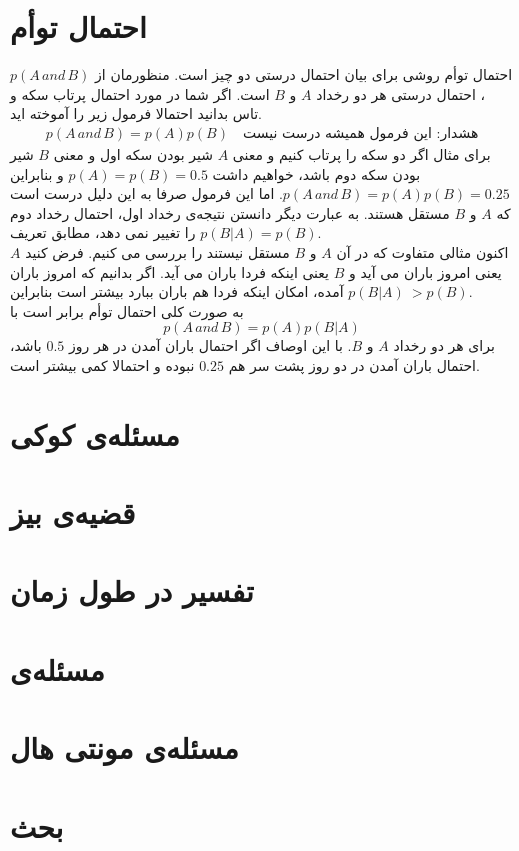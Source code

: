 \section{احتمال توأم}
احتمال توأم  روشی برای بیان احتمال درستی دو چیز است. منظورمان از $p(A \,and\, B)$، احتمال درستی هر دو رخداد $A$ و $B$ است. اگر شما در مورد احتمال پرتاب سکه و تاس بدانید احتمالا فرمول زیر را آموخته اید.
\begin{align*}
 p(A \,and\, B) = p(A)p(B) \quad \text{هشدار: این فرمول همیشه درست نیست}
\end{align*}
برای مثال اگر دو سکه را پرتاب کنیم و معنی $A$ شیر بودن سکه اول و معنی $B$ شیر بودن سکه دوم باشد، خواهیم داشت $p(A) = p(B) = 0.5$ و بنابراین $p(A \,and\, B) = p(A)p(B) = 0.25$. اما این فرمول صرفا به این دلیل درست است که $A$ و $B$ مستقل هستند. به عبارت دیگر دانستن نتیجه‌ی رخداد اول، احتمال رخداد دوم را تغییر نمی دهد، مطابق تعریف $p(B|A) = p(B)$.\\
اکنون مثالی متفاوت که در  آن $A$ و $B$ مستقل نیستند را بررسی می کنیم. فرض کنید $A$ یعنی امروز باران می آید و $B$ یعنی اینکه فردا باران می آید. اگر بدانیم که امروز باران آمده، امکان اینکه فردا هم باران ببارد بیشتر است بنابراین $p(B|A) \ > p(B)$.\\
به صورت کلی احتمال توأم برابر است با
$$ p(A \,and\, B) = p(A)p(B|A) $$
برای هر دو رخداد $A$ و $B$. با این اوصاف اگر احتمال باران آمدن در هر روز $0.5$ باشد، احتمال باران آمدن در دو روز پشت سر هم $0.25$ نبوده و احتمالا کمی بیشتر است.
\section{مسئله‌ی کوکی}
\section{قضیه‌ی بیز}
\section{تفسیر در طول زمان}
\section{مسئله‌ی }
\section{مسئله‌ی مونتی هال}
\section{بحث}

